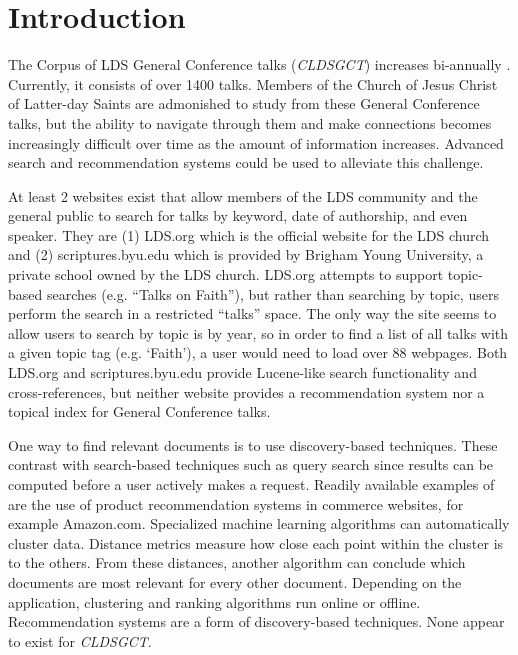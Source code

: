 \chapter{Introduction}

The Corpus of LDS General Conference talks (\emph{CLDSGCT}) increases bi-annually \citep{davies:gc}. Currently, it consists of over 1400 talks. Members of the Church of Jesus Christ of Latter-day Saints are admonished to study from these General Conference talks, but the ability to navigate through them and make connections becomes increasingly difficult over time as the amount of information increases. Advanced search and recommendation systems could be used to alleviate this challenge.

At least 2 websites exist that allow members of the LDS community and the general public to search for talks by keyword, date of authorship, and even speaker. They are (1) LDS.org which is the official website for the LDS church and (2) scriptures.byu.edu which is provided by Brigham Young University, a private school owned by the LDS church. LDS.org attempts to support topic-based searches (e.g. ``Talks on Faith''), but rather than searching by topic, users perform the search in a restricted ``talks'' space. The only way the site seems to allow users to search by topic is by year, so in order to find a list of all talks with a given topic tag (e.g. `Faith'), a user would need to load over 88 webpages. Both LDS.org and scriptures.byu.edu provide Lucene-like search functionality \citep{McCandless:2010:LAS:1893016,lucene:luke} and cross-references, but neither website provides a recommendation system nor a topical index for General Conference talks.

One way to find relevant documents is to use discovery-based techniques. These contrast with search-based techniques such as query search since results can be computed before a user actively makes a request. Readily available examples of are the use of product recommendation systems in commerce websites, for example Amazon.com. Specialized machine learning algorithms can automatically cluster data. Distance metrics measure how close each point within the cluster is to the others. From these distances, another algorithm can conclude which documents are most relevant for every other document. Depending on the application, clustering and ranking algorithms run online or offline. Recommendation systems are a form of discovery-based techniques. None appear to exist for \emph{CLDSGCT}.

